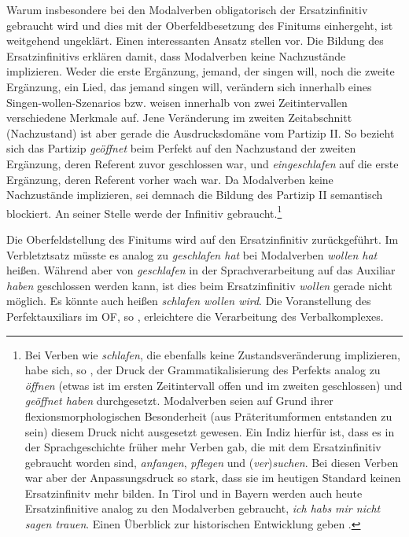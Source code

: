 Warum insbesondere bei den Modalverben obligatorisch der Ersatzinfinitiv gebraucht wird und dies mit der Oberfeldbesetzung des Finitums einhergeht, ist weitgehend ungeklärt. Einen interessanten Ansatz stellen \citet{EisenbergSmithTeuber2001} vor. Die Bildung des Ersatzinfinitivs erklären \citet[256]{EisenbergSmithTeuber2001} damit, dass Modalverben keine Nachzustände implizieren. Weder die erste Ergänzung, \zB jemand, der singen will, noch die zweite Ergänzung, \zB ein Lied, das jemand singen will, verändern sich innerhalb eines Singen-wollen-Szenarios bzw. weisen innerhalb von zwei Zeitintervallen verschiedene Merkmale auf. Jene Veränderung im zweiten Zeitabschnitt (Nachzustand) ist aber gerade die Ausdrucksdomäne vom Partizip II. So bezieht sich das Partizip \textit{geöffnet} beim Perfekt auf den Nachzustand der zweiten Ergänzung, deren Referent zuvor geschlossen war, und \textit{eingeschlafen} auf die erste Ergänzung, deren Referent vorher wach war. Da Modalverben keine Nachzustände implizieren, sei demnach die Bildung des Partizip II semantisch blockiert. An seiner Stelle werde der Infinitiv gebraucht.\footnote{Bei Verben wie \textit{schlafen}, die ebenfalls keine Zustandsveränderung implizieren, habe sich, so \citet[256]{EisenbergSmithTeuber2001}, der Druck der Grammatikalisierung des Perfekts analog zu \textit{öffnen} (etwas ist im ersten Zeitintervall offen und im zweiten geschlossen) und \textit{geöffnet haben} durchgesetzt. Modalverben seien auf Grund ihrer flexionsmorphologischen Besonderheit (aus Präteritumformen entstanden zu sein) diesem Druck nicht ausgesetzt gewesen. Ein Indiz hierfür ist, dass es in der Sprachgeschichte früher mehr Verben gab, die mit dem Ersatzinfinitiv gebraucht worden sind, \zB \textit{anfangen}, \textit{pflegen} und (\textit{ver})\textit{suchen}. Bei diesen Verben war aber der Anpassungsdruck so stark, dass sie im heutigen Standard keinen Ersatzinfinitv mehr bilden. In Tirol und in Bayern werden auch heute Ersatzinfinitive analog zu den Modalverben gebraucht, \zB \textit{ich habs mir nicht sagen trauen}. Einen Überblick zur historischen Entwicklung geben \citet[179--193]{Fleischer2001}.} 

Die Oberfeldstellung des Finitums wird auf den Ersatzinfinitiv zurückgeführt. Im Verbletztsatz müsste es analog zu \textit{geschlafen hat} bei Modalverben \zB \textit{wollen hat} heißen. Während aber von \textit{geschlafen} in der Sprachverarbeitung auf das Auxiliar \textit{haben} geschlossen werden kann, ist dies beim Ersatzinfinitiv \textit{wollen} gerade nicht möglich. Es könnte auch heißen \textit{schlafen wollen wird}. Die Voranstellung des Perfektauxiliars im OF, so \citet[258]{EisenbergSmithTeuber2001}, erleichtere die Verarbeitung des Verbalkomplexes.


